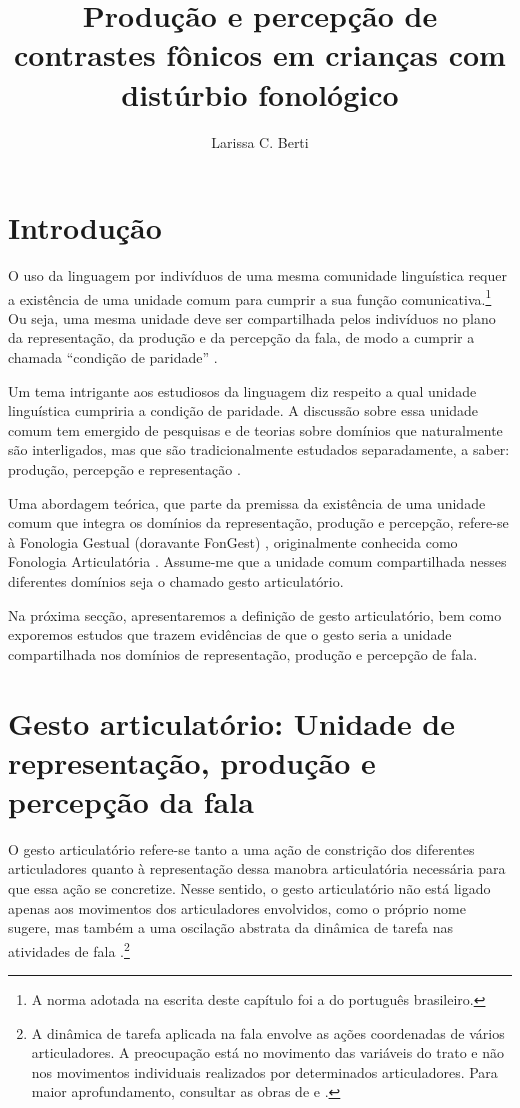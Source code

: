 \documentclass[output=paper,colorlinks,citecolor=brown,booklanguage=portuguese]{langscibook}
\title{Produção e percepção de contrastes fônicos em crianças com distúrbio fonológico}
\author{Larissa C. Berti \affiliation{Universidade Estadual Paulista – UNESP/Marília}}
\begin{document}
\maketitle

\section{Introdução}
O uso da linguagem por indivíduos de uma mesma comunidade linguística requer a existência de uma unidade comum para cumprir a sua função comunicativa.\footnote{A norma adotada na escrita deste capítulo foi a do português brasileiro.}
Ou seja, uma mesma unidade deve ser compartilhada pelos indivíduos no plano da representação, da produção e da percepção da fala, de modo a cumprir a chamada “condição de paridade” \citep{Liberman2000}.

Um tema intrigante aos estudiosos da linguagem diz respeito a qual unidade linguística cumpriria a condição de paridade. A discussão sobre essa unidade comum tem emergido de pesquisas e de teorias sobre domínios que naturalmente são interligados, mas que são tradicionalmente estudados separadamente, a saber: produção, percepção e representação \citep{Goldstein2003a}.

Uma abordagem teórica, que parte da premissa da existência de uma unidade comum que integra os domínios da representação, produção e percepção, refere-se à Fonologia Gestual (doravante FonGest) \citep{Albano2012, Albano2020},  originalmente conhecida como Fonologia Articulatória \citep{Browman1992, Goldstein2003a, Fowler2005}. Assume-me que a unidade comum compartilhada nesses diferentes domínios seja o chamado gesto articulatório.

Na próxima secção, apresentaremos a definição de gesto articulatório, bem como exporemos estudos que trazem evidências de que o gesto seria a unidade compartilhada nos domínios de representação, produção e percepção de fala.
\section{Gesto articulatório: Unidade de representação, produção e percepção da fala}
O gesto articulatório refere-se tanto a uma ação de constrição dos diferentes articuladores quanto à representação dessa manobra articulatória necessária para que essa ação se concretize. Nesse sentido, o gesto articulatório não está ligado apenas aos movimentos dos articuladores envolvidos, como o próprio nome sugere, mas também a uma oscilação abstrata da dinâmica de tarefa nas atividades de fala \citep{Saltzman1987}.\footnote{A dinâmica de tarefa aplicada na fala envolve as ações coordenadas de vários articuladores. A preocupação está no movimento das variáveis do trato e não nos movimentos individuais realizados por determinados articuladores. Para maior aprofundamento, consultar as obras de \citet{Browman1992} e \citet{Albano2001, Albano2012}.} 
\end{document}
